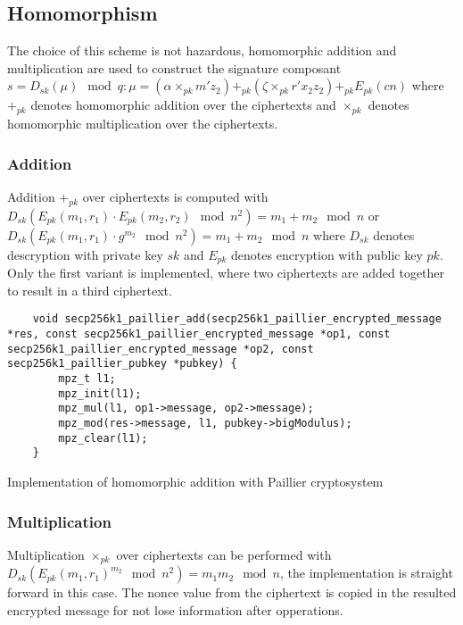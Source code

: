 \subsection{Homomorphism}

The choice of this scheme is not hazardous, homomorphic addition and multiplication
are used to construct the signature composant $s = D_{sk}(\mu) \mod q : \mu =
(\alpha \times_{pk} m'z_2) +_{pk} (\zeta \times_{pk} r'x_2z_2) +_{pk} E_{pk}(cn)$
where $+_{pk}$ denotes homomorphic addition over the ciphertexts and $\times_{pk}$
denotes homomorphic multiplication over the ciphertexts.

\subsubsection{Addition}
Addition $+_{pk}$ over ciphertexts is computed with
$D_{sk}(E_{pk}(m_1, r_1) \cdot E_{pk}(m_2, r_2) \mod n^2) = m_1 + m_2 \mod n$ or
$D_{sk}(E_{pk}(m_1, r_1) \cdot g^{m_2} \mod n^2) = m_1 + m_2 \mod n$ where $D_{sk}$
denotes descryption with private key $sk$ and $E_{pk}$ denotes encryption with
public key $pk$. Only the first variant is implemented, where two ciphertexts are
added together to result in a third ciphertext.

\begin{listing}
  \begin{verbatim}
    void secp256k1_paillier_add(secp256k1_paillier_encrypted_message *res, const secp256k1_paillier_encrypted_message *op1, const secp256k1_paillier_encrypted_message *op2, const secp256k1_paillier_pubkey *pubkey) {
        mpz_t l1;
        mpz_init(l1);
        mpz_mul(l1, op1->message, op2->message);
        mpz_mod(res->message, l1, pubkey->bigModulus);
        mpz_clear(l1);
    }
  \end{verbatim}
	\caption{Implementation of homomorphic addition with Paillier cryptosystem}
	\label{lst:implDecryptPaillier}
\end{listing}

\subsubsection{Multiplication}

Multiplication $\times_{pk}$ over ciphertexts can be performed with
$D_{sk}(E_{pk}(m_1, r_1)^{m_2} \mod n^2) = m_1 m_2 \mod n$, the implementation
is straight forward in this case. The nonce value from the ciphertext is copied
in the resulted encrypted message for not lose information after opperations.

